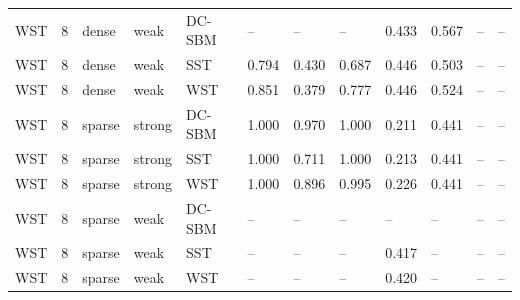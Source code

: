 \begin{table}[!h]
\begin{tabular}[t]{llllllllllll}
WST & 8 & dense & weak & DC-SBM & -- & -- & -- & 0.433 & 0.567 & -- & --\\
WST & 8 & dense & weak & SST & 0.794 & 0.430 & 0.687 & 0.446 & 0.503 & -- & --\\
WST & 8 & dense & weak & WST & 0.851 & 0.379 & 0.777 & 0.446 & 0.524 & -- & --\\
WST & 8 & sparse & strong & DC-SBM & 1.000 & 0.970 & 1.000 & 0.211 & 0.441 & -- & --\\
WST & 8 & sparse & strong & SST & 1.000 & 0.711 & 1.000 & 0.213 & 0.441 & -- & --\\
WST & 8 & sparse & strong & WST & 1.000 & 0.896 & 0.995 & 0.226 & 0.441 & -- & --\\
WST & 8 & sparse & weak & DC-SBM & -- & -- & -- & -- & -- & -- & --\\
WST & 8 & sparse & weak & SST & -- & -- & -- & 0.417 & -- & -- & --\\
WST & 8 & sparse & weak & WST & -- & -- & -- & 0.420 & -- & -- & --\\
\bottomrule
\end{tabular}
\end{table}
